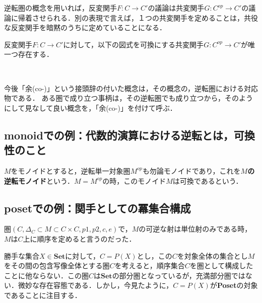\documentclass[uplatex, 12pt, dvipdfmx]{jsreport}
\begin{document}
逆転圏の概念を用いれば，反変関手$F:C\rightarrow C'$の議論は共変関手$G:C^{op}\rightarrow C'$の議論に帰着させられる．別の表現で言えば，１つの共変関手を定めることは，共役な反変関手を暗黙のうちに定めていることになる．
\begin{proposition}[反変関手に対応する共変関手]
    反変関手$F:C\rightarrow C'$に対して，以下の図式を可換にする共変関手$G:C^{op}\rightarrow C'$が唯一つ存在する．
    \begin{center}  \end{center}
\end{proposition}

今後「余(co-)」という接頭辞の付いた概念は，その概念の，逆転圏における対応物である．
ある圏で成り立つ事柄は，その逆転圏でも成り立つから，そのようにして見なして良い概念を，「余(co-)」を付けて呼ぶ．

\subsection{monoidでの例：代数的演算における逆転とは，可換性のこと}
$M$をモノイドとすると，逆転単一対象圏$M^{op}$も勿論モノイドであり，これを\textbf{$M$の逆転モノイド}という．$M=M^{op}$の時，このモノイド$M$は可換であるという．

\subsection{posetでの例：関手としての冪集合構成}
圏$(C,\Delta_C\subset M\subset C\times C, p1,p2,c,e)$で，$M$の可逆な射は単位射のみである時，$M$は$C$上に順序を定めると言うのだった．

勝手な集合$X\in\mathbf{Set}$に対して，$C=P(X)$とし，この$C$を対象全体の集合とし$M$をその間の包含写像全体とする圏$C$を考えると，順序集合$C$を圏として構成したことに他ならない．この圏$C$は$\mathbf{Set}$の部分圏となっているが，充満部分圏ではない．微妙な存在容態である．しかし，今見たように，$C=P(X)$が\textbf{Poset}の対象であることに注目する．
\end{document}
